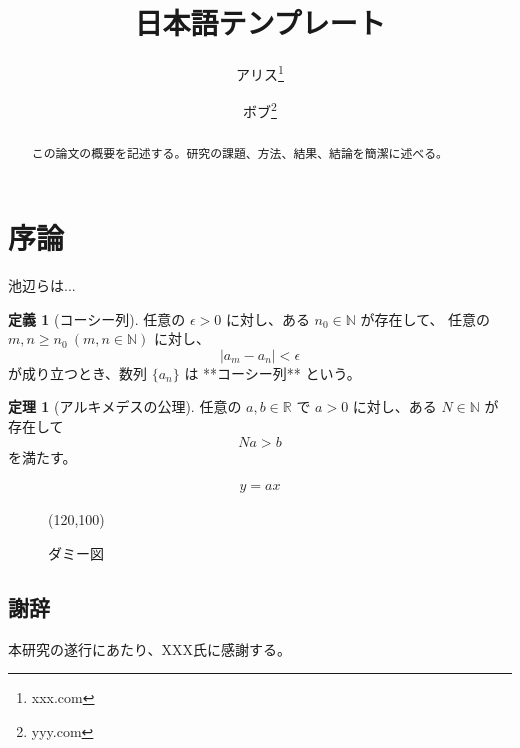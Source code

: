 \documentclass[12pt,dvipdfmx]{jlreq} %
\title{日本語テンプレート}
\author[1]{アリス\thanks{xxx.com}}
\author[1,2]{ボブ\thanks{yyy.com}}
\affil[1]{XXX大学}
\affil[2]{YYY大学}
\date{\empty}
\theoremstyle{definition}
\newtheorem{dfn}{定義}
\newtheorem{thm}{定理}
\begin{document}
\maketitle

\begin{abstract}
この論文の概要を記述する。研究の課題、方法、結果、結論を簡潔に述べる。
\end{abstract}

\section*{序論}
池辺らは...\cite{Ikebe2016-sg}

\begin{dfn}[コーシー列]
任意の $\epsilon > 0$ に対し、ある $n_0 \in \mathbb{N}$ が存在して、
任意の $m, n \geq n_0 \ (m,n \in \mathbb{N})$ に対し、
\[
\lvert a_m  - a_n  \rvert < \epsilon
\]
が成り立つとき、数列 $\{a_n\}$ は **コーシー列** という。
\end{dfn}	

\begin{thm}[アルキメデスの公理]
任意の $a, b \in \mathbb{R}$ で $a > 0$ に対し、ある $N \in \mathbb{N}$ が存在して
\[
Na > b
\]
を満たす。
\end{thm}

\begin{align}
y=ax
\end{align}

\begin{figure}[htbp]
    \centering
    \framebox(120,100){} 
    \caption{ダミー図}
    \label{fig:dummy}
\end{figure}

\subsection*{謝辞}
本研究の遂行にあたり、XXX氏に感謝する。

\end{document}
